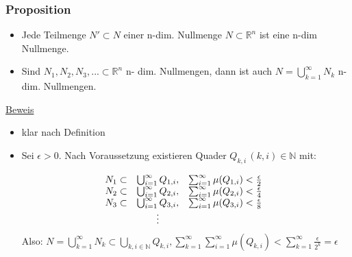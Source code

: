 \subsubsection{Proposition}
\begin{itemize}
	\item Jede Teilmenge $N' \subset N$ einer n-dim. Nullmenge $N \subset \mathbb{R}^n$ ist eine n-dim Nullmenge.\item Sind $N_1, N_2, N_3, ... \subset \mathbb{R}^n$ n- dim. Nullmengen, dann ist auch $N = \bigcup_{k=1}^\infty N_k$ n-dim. Nullmengen.
\end{itemize}
\underline{Beweis}
\begin{itemize}
	\item klar nach Definition
	\item Sei $\epsilon > 0$. Nach Voraussetzung existieren Quader $Q_{k,i} \, (k,i) \in \mathbb{N}$ mit:
	
	\begin{equation*}
		\begin{matrix}
		N_1 \subset & \bigcup_{i =1}^{\infty} Q_{1,i}, & \sum_{i=1}^{\infty} \mu(Q_{1,i}) < \frac{\epsilon}{2}\\
		N_2 \subset & \bigcup_{i =1}^{\infty} Q_{2,i}, & \sum_{i=1}^{\infty} \mu(Q_{2,i}) < \frac{\epsilon}{4}\\
		N_3 \subset & \bigcup_{i =1}^{\infty} Q_{3,i}, & \sum_{i=1}^{\infty} \mu(Q_{3,i}) < \frac{\epsilon}{8}\\
		& \vdots
		\end{matrix}\\
	\end{equation*}	
	Also: $N = \bigcup_{k=1}^{\infty} N_k \subset \bigcup_{k,i \in \mathbb{N}} Q_{k,i}, \sum_{k=1}^{\infty}\sum_{i=1}^{\infty} \mu(Q_{k,i}) < \sum_{k=1}^{\infty} \frac{\epsilon}{2^k} = \epsilon$
	\proofend
\end{itemize}
